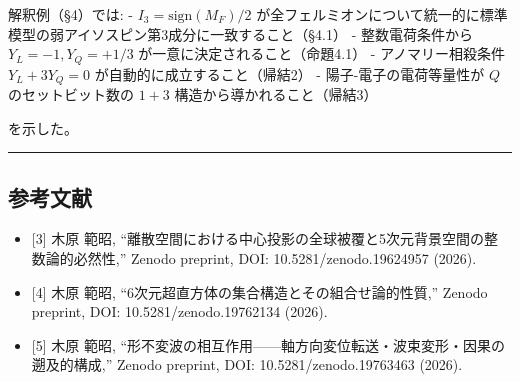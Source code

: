 \documentclass[
  a4paper,11pt]{ltjsarticle}
\providecommand{\tightlist}{%
  \setlength{\itemsep}{0pt}\setlength{\parskip}{0pt}}
\begin{document}
解釈例（§4）では: - \(I_3 = \text{sign}(M_F)/2\)
が全フェルミオンについて統一的に標準模型の弱アイソスピン第3成分に一致すること（§4.1）
- 整数電荷条件から \(Y_L = -1, Y_Q = +1/3\)
が一意に決定されること（命題4.1） - アノマリー相殺条件
\(Y_L + 3Y_Q = 0\) が自動的に成立すること（帰結2） -
陽子-電子の電荷等量性が \(Q\) のセットビット数の \(1+3\)
構造から導かれること（帰結3）

を示した。

\begin{center}\rule{0.5\linewidth}{0.5pt}\end{center}

\subsection{参考文献}\label{ux53c2ux8003ux6587ux732e}

\begin{itemize}
\tightlist
\item
  {[}3{]} 木原 範昭,
  ``離散空間における中心投影の全球被覆と5次元背景空間の整数論的必然性,''
  Zenodo preprint, DOI: 10.5281/zenodo.19624957 (2026).
\item
  {[}4{]} 木原 範昭, ``6次元超直方体の集合構造とその組合せ論的性質,''
  Zenodo preprint, DOI: 10.5281/zenodo.19762134 (2026).
\item
  {[}5{]} 木原 範昭,
  ``形不変波の相互作用------軸方向変位転送・波束変形・因果の遡及的構成,''
  Zenodo preprint, DOI: 10.5281/zenodo.19763463 (2026).
\end{itemize}
\end{document}

